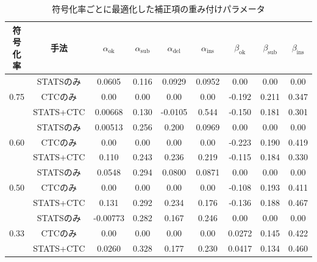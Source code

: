 \documentclass[sotsuron]{kuee}
\begin{document}
\begin{table}
  \centering
  \caption{符号化率ごとに最適化した補正項の重み付けパラメータ}
  \label{tab:appendix_params_alpha_beta}
  \footnotesize
  \begin{tabular}{c|c|cccc|ccc}
    \hline
    符号化率 & 手法 & $\alpha_{\mathrm{ok}}$ & $\alpha_{\mathrm{sub}}$ & $\alpha_{\mathrm{del}}$ & $\alpha_{\mathrm{ins}}$ & $\beta_{\mathrm{ok}}$ & $\beta_{\mathrm{sub}}$ & $\beta_{\mathrm{ins}}$ \\
    \hline
    \multirow{3}{*}{0.75} & STATSのみ& 0.0605 & 0.116 & 0.0929 & 0.0952 & 0.00 & 0.00 & 0.00 \\
    & CTCのみ& 0.00 & 0.00 & 0.00 & 0.00 & -0.192 & 0.211 & 0.347 \\
    & STATS+CTC& 0.00668 & 0.130 & -0.0105 & 0.544 & -0.150 & 0.181 & 0.301 \\
    \hline
    \multirow{3}{*}{0.60} & STATSのみ & 0.00513 & 0.256 & 0.200 & 0.0969 & 0.00 & 0.00 & 0.00 \\
    & CTCのみ & 0.00 & 0.00 & 0.00 & 0.00 & -0.223 & 0.190 & 0.419 \\
    & STATS+CTC & 0.110 & 0.243 & 0.236 & 0.219 & -0.115 & 0.184 & 0.330 \\
    \hline
    \multirow{3}{*}{0.50} & STATSのみ & 0.0548 & 0.294 & 0.0800 & 0.0871 & 0.00 & 0.00 & 0.00 \\
    & CTCのみ & 0.00 & 0.00 & 0.00 & 0.00 & -0.108 & 0.193 & 0.411 \\
    & STATS+CTC & 0.131 & 0.292 & 0.234 & 0.176 & -0.136 & 0.188 & 0.467 \\
    \hline
    \multirow{3}{*}{0.33} & STATSのみ & -0.00773 & 0.282 & 0.167 & 0.246 & 0.00 & 0.00 & 0.00 \\
    & CTCのみ & 0.00 & 0.00 & 0.00 & 0.00 & 0.0272 & 0.145 & 0.422 \\
    & STATS+CTC & 0.0260 & 0.328 & 0.177 & 0.230 & 0.0417 & 0.134 & 0.460 \\
    \hline
  \end{tabular}
\end{table}
\end{document}
